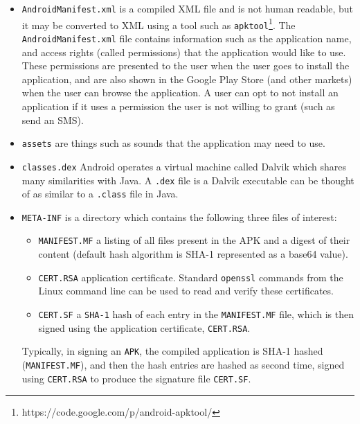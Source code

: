 \documentclass[a4paper]{article}
\begin{document}
\begin{itemize}
  \item \texttt{AndroidManifest.xml} is a compiled XML file and is not human
  readable, but it may be converted to XML using a tool such as
\texttt{apktool}\footnote{https://code.google.com/p/android-apktool/}.
The \texttt{AndroidManifest.xml} file contains information such as the application
name, and access rights (called permissions) that the application would like to
use. These permissions are presented to the user when the user goes to install
the application, and are also shown in the Google Play Store (and other markets)
when the user can browse the application. A user can opt to not install an
application if it uses a permission the user is not willing to grant (such as
send an SMS).

  \item \texttt{assets} are things such as sounds that the application may need
to use.

  \item \texttt{classes.dex} Android operates a virtual machine called Dalvik
  which shares many similarities with Java. A \texttt{.dex} file is a Dalvik executable
can be thought of as similar to a \texttt{.class} file in Java.

  \item \texttt{META-INF} is a directory which contains the following three
  files of interest:
\begin{itemize}
  \item \texttt{MANIFEST.MF} a listing of all files present in the APK and a
  digest of their content (default hash algorithm is SHA-1 represented as a
  base64 value).
  \item \texttt{CERT.RSA} application certificate. Standard \texttt{openssl}
  commands from the Linux command line can be used to read and verify these
  certificates.
  \item \texttt{CERT.SF} a \texttt{SHA-1} hash of each entry in the
  \texttt{MANIFEST.MF} file, which is then signed using the application
  certificate, \texttt{CERT.RSA}. 
  \end{itemize}
  
  Typically, in signing an \texttt{APK}, the compiled application is SHA-1
  hashed (\texttt{MANIFEST.MF}), and then the hash entries are hashed as second
  time, signed using \texttt{CERT.RSA} to produce the signature file
  \texttt{CERT.SF}.
  
\end{itemize}
\end{document}
